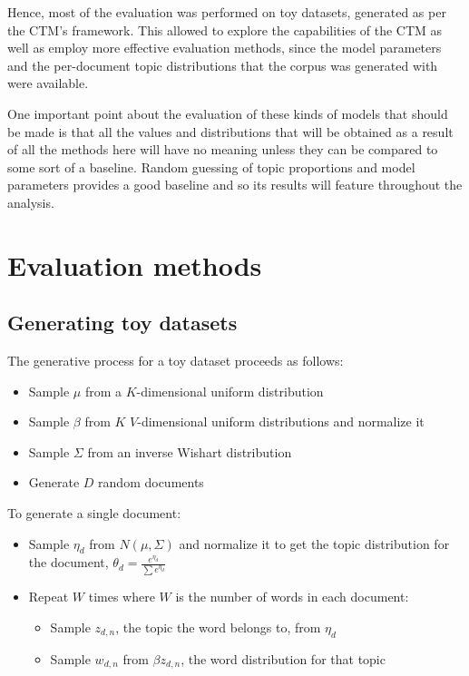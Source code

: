 \documentclass[12pt,a4paper,twoside,openright]{report}
\begin{document}
Hence, most of the evaluation was performed on toy datasets, generated as per the CTM's framework. This allowed to explore the capabilities of the CTM as well as employ more effective evaluation methods, since the model parameters and the per-document topic distributions that the corpus was generated with were available.

One important point about the evaluation of these kinds of models that should be made is that all the values and distributions that will be obtained as a result of all the methods here will have no meaning unless they can be compared to some sort of a baseline. Random guessing of topic proportions and model parameters provides a good baseline and so its results will feature throughout the analysis.

\section{Evaluation methods}

\subsection{Generating toy datasets}

The generative process for a toy dataset proceeds as follows:

\begin{itemize}[noitemsep]
\item Sample $\mu$ from a $K$-dimensional uniform distribution
\item Sample $\beta$ from $K$ $V$-dimensional uniform distributions and normalize it
\item Sample $\Sigma$ from an inverse Wishart distribution
\item Generate $D$ random documents
\end{itemize}

To generate a single document:

\begin{itemize}[noitemsep]
\item Sample $\eta_d$ from $N(\mu, \Sigma)$ and normalize it to get the topic distribution for the document, $\theta_d = \frac{e^{\eta_d}}{\sum{e^{\eta_d}}}$
\item Repeat $W$ times where $W$ is the number of words in each document:
\begin{itemize}[noitemsep]
\item Sample $z_{d, n}$, the topic the word belongs to, from $\eta_d$
\item Sample $w_{d, n}$ from $\beta{z_{d, n}}$, the word distribution for that topic
\end{itemize}
\end{itemize}
\end{document}
